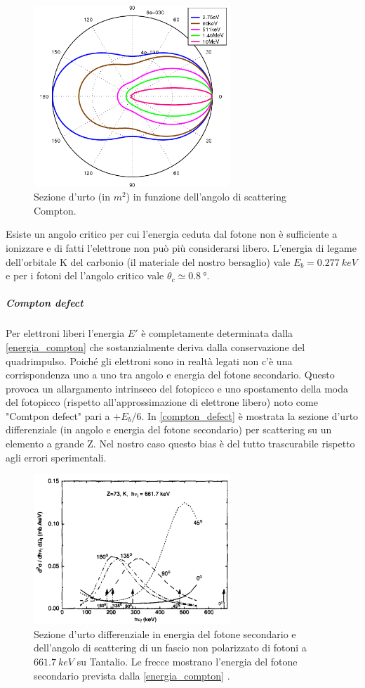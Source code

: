   \begin{figure}[h]
 	\centering
 	\includegraphics[width=20em]{klein-nishina}
 	\caption{\label{fig:klein-nishina}Sezione d'urto (in $\si{m^2}$) in funzione dell'angolo di scattering Compton.}
 \end{figure}

 Esiste un angolo critico per cui l'energia ceduta dal fotone non è sufficiente a ionizzare e di fatti l'elettrone non può più considerarsi libero. L'energia di legame dell'orbitale K del carbonio (il materiale del nostro bersaglio) vale $E_b = \SI{0.277}{keV}$ e per i fotoni del \co\; l'angolo critico vale $\theta_c \simeq \SI{0.8}{\degree}$.
 
 \subparagraph{Compton defect} \cite{7,8}
 Per elettroni liberi l'energia $E'$ è completamente determinata dalla \autoref{energia_compton} che sostanzialmente deriva dalla conservazione del quadrimpulso. Poiché gli elettroni sono in realtà legati non c'è una corrispondenza uno a uno tra angolo e energia del fotone secondario. Questo provoca un allargamento intrinseco del fotopicco e uno spostamento della moda del fotopicco (rispetto all'approssimazione di elettrone libero) noto come "Comtpon defect" pari a $+E_b/6$. In \autoref{compton_defect} è mostrata la sezione d'urto differenziale (in angolo e energia del fotone secondario) per scattering su un elemento a grande Z. Nel nostro caso questo bias è del tutto trascurabile rispetto agli errori sperimentali.
 
 \begin{figure}[h]
	\centering
	\includegraphics[width=20em]{compton_defect}
	\caption{\label{fig:compton_defect}Sezione d'urto differenziale in energia del fotone secondario e dell'angolo di scattering di un fascio non polarizzato di fotoni a $\SI{661.7}{keV}$  su Tantalio. Le frecce mostrano l'energia del fotone secondario prevista dalla \autoref{energia_compton} \cite{8}.}
\end{figure}


